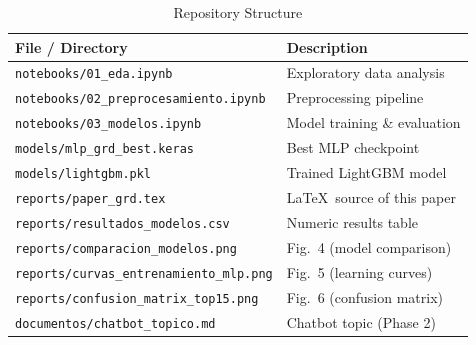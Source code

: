 \documentclass{IEEEtran}
\begin{document}
\begin{table}[H]
  \centering
  \caption{Repository Structure}
  \label{tab:repo}
  \begin{tabular}{ll}
    \toprule
    File / Directory & Description \\
    \midrule
    \texttt{notebooks/01\_eda.ipynb}            & Exploratory data analysis \\
    \texttt{notebooks/02\_preprocesamiento.ipynb} & Preprocessing pipeline \\
    \texttt{notebooks/03\_modelos.ipynb}         & Model training \& evaluation \\
    \midrule
    \texttt{models/mlp\_grd\_best.keras}         & Best MLP checkpoint \\
    \texttt{models/lightgbm.pkl}                 & Trained LightGBM model \\
    \midrule
    \texttt{reports/paper\_grd.tex}              & \LaTeX\ source of this paper \\
    \texttt{reports/resultados\_modelos.csv}     & Numeric results table \\
    \texttt{reports/comparacion\_modelos.png}    & Fig.~4 (model comparison) \\
    \texttt{reports/curvas\_entrenamiento\_mlp.png} & Fig.~5 (learning curves) \\
    \texttt{reports/confusion\_matrix\_top15.png} & Fig.~6 (confusion matrix) \\
    \midrule
    \texttt{documentos/chatbot\_topico.md}       & Chatbot topic (Phase 2) \\
    \bottomrule
  \end{tabular}
\end{table}
\end{document}
